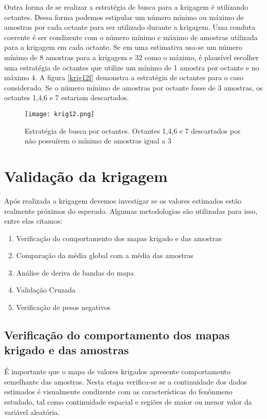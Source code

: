 Outra forma de se realizar a estratégia de busca para a krigagem é utilizando octantes. Dessa forma podemos estipular um número mínimo ou máximo de amostras por cada octante para ser utilizado durante a krigagem. Uma conduta coerente é ser condizente com o número mínimo e máximo de amostras utilizada para a krigagem em cada octante. Se em uma estimativa usa-se um número mínimo de 8 amostras para a krigagem e 32 como o máximo, é plausível escolher uma estratégia de octantes que utilize um mínimo de 1 amostra por octante e no máximo 4. A figura \eqref{krig12f} demonstra a estratégia de octantes para o caso considerado. Se o número mínimo de amostras por octante fosse de 3 amostras, os octantes 1,4,6 e 7 estariam descartados. 

\begin{figure}[H]
	\centering
	\texttt{[image: krig12.png]}
	\caption{Estratégia de busca por octantes. Octantes 1,4,6 e 7 descartados por não possuírem o mínimo de amostras igual a 3 }
	\label{krig12f}
\end{figure}

\section{Validação da krigagem}

Após realizada a krigagem devemos investigar se os valores estimados estão realmente próximos do esperado. Algumas metodologias são utilizadas para isso, entre elas citamos:

\begin{enumerate} 
	\item Verificação do comportamento dos mapas krigado e das amostras
	\item Comparação da média global com a média das amostras
	\item Análise de deriva de bandas do mapa 
	\item Validação Cruzada
	\item Verificação de pesos negativos	
\end{enumerate}

\subsection{Verificação do comportamento dos mapas krigado e das amostras}

É importante que o mapa de valores krigados apresente comportamento semelhante das amostras. Nesta etapa verifica-se se a continuidade dos dados estimados é visualmente condizente com as características do fenônmeno estudado, tal como continuidade espacial e regiões de maior ou menor valor da variável aleatória. 

